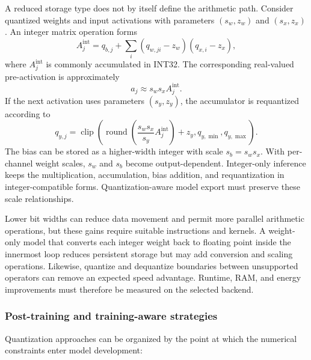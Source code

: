 \documentclass[
    a4paper,
    12pt,
    titlepage,
    bibliography=totoc,
    twoside=on,
    parskip=false,
    numbers=noenddot,
    cleardoublepage=empty,
    DIV=12,
    BCOR=12.0mm,
    headheight=36pt,
    headings=openright
]{scrreprt}
\begin{document}
A reduced storage type does not by itself define the arithmetic path. Consider quantized weights and input activations with parameters $(s_w,z_w)$ and $(s_x,z_x)$. An integer matrix operation forms
\begin{equation}
    A_j^{\mathrm{int}}
    =
    q_{b,j}
    +
    \sum_i
    \left(q_{w,ji}-z_w\right)
    \left(q_{x,i}-z_x\right),
    \label{eq:fundamental_integer_accumulation}
\end{equation}
where $A_j^{\mathrm{int}}$ is commonly accumulated in INT32. The corresponding real-valued pre-activation is approximately
\begin{equation}
    a_j
    \approx
    s_w s_x A_j^{\mathrm{int}}.
    \label{eq:fundamental_integer_reconstruction}
\end{equation}
If the next activation uses parameters $(s_y,z_y)$, the accumulator is requantized according to
\begin{equation}
    q_{y,j}
    =
    \operatorname{clip}\!\left(
    \operatorname{round}\!\left(
    \frac{s_w s_x}{s_y}
    A_j^{\mathrm{int}}
    \right)+z_y,
    q_{y,\min},q_{y,\max}
    \right).
    \label{eq:fundamental_requantization}
\end{equation}
The bias can be stored as a higher-width integer with scale $s_b=s_ws_x$. With per-channel weight scales, $s_w$ and $s_b$ become output-dependent. Integer-only inference keeps the multiplication, accumulation, bias addition, and requantization in integer-compatible forms. Quantization-aware model export must preserve these scale relationships.\autocite{jacobQuantizationTrainingNeural2017}

Lower bit widths can reduce data movement and permit more parallel arithmetic operations, but these gains require suitable instructions and kernels.\autocite{horowitzComputingEnergyProblem2014} A weight-only model that converts each integer weight back to floating point inside the innermost loop reduces persistent storage but may add conversion and scaling operations. Likewise, quantize and dequantize boundaries between unsupported operators can remove an expected speed advantage. Runtime, RAM, and energy improvements must therefore be measured on the selected backend.

\subsubsection{Post-training and training-aware strategies}

Quantization approaches can be organized by the point at which the numerical constraints enter model development:
\end{document}
